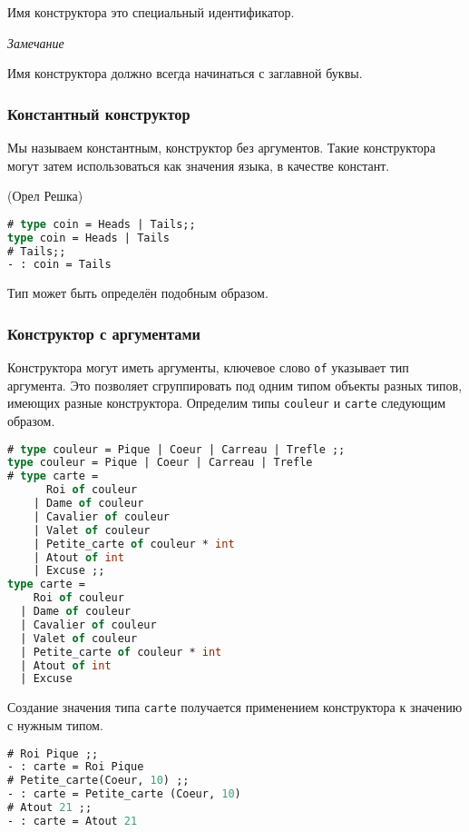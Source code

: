 Имя конструктора это специальный идентификатор.

{\it Замечание}

Имя конструктора должно всегда начинаться с заглавной буквы.

\subsubsection{Константный конструктор}

Мы называем константным, конструктор без аргументов. Такие конструктора могут
затем использоваться как значения языка, в качестве констант.

(Орел Решка)

\begin{lstlisting}[language=OCaml]
# type coin = Heads | Tails;;
type coin = Heads | Tails
# Tails;;
- : coin = Tails
\end{lstlisting}

Тип может быть определён подобным образом.

\subsubsection{Конструктор с аргументами}

Конструктора могут иметь аргументы, ключевое слово \texttt{of} указывает тип
аргумента. Это позволяет сгруппировать под одним типом объекты разных типов,
имеющих разные конструктора. Определим типы \texttt{couleur} и \texttt{carte}
следующим образом.

\begin{lstlisting}[language=OCaml]
# type couleur = Pique | Coeur | Carreau | Trefle ;;
type couleur = Pique | Coeur | Carreau | Trefle
# type carte =
      Roi of couleur
    | Dame of couleur
    | Cavalier of couleur
    | Valet of couleur
    | Petite_carte of couleur * int
    | Atout of int
    | Excuse ;;
type carte =
    Roi of couleur
  | Dame of couleur
  | Cavalier of couleur
  | Valet of couleur
  | Petite_carte of couleur * int
  | Atout of int
  | Excuse
\end{lstlisting}

Создание значения типа \texttt{carte} получается применением конструктора к
значению с нужным типом.

\begin{lstlisting}[language=OCaml]
# Roi Pique ;;
- : carte = Roi Pique
# Petite_carte(Coeur, 10) ;;
- : carte = Petite_carte (Coeur, 10)
# Atout 21 ;;
- : carte = Atout 21
\end{lstlisting}

